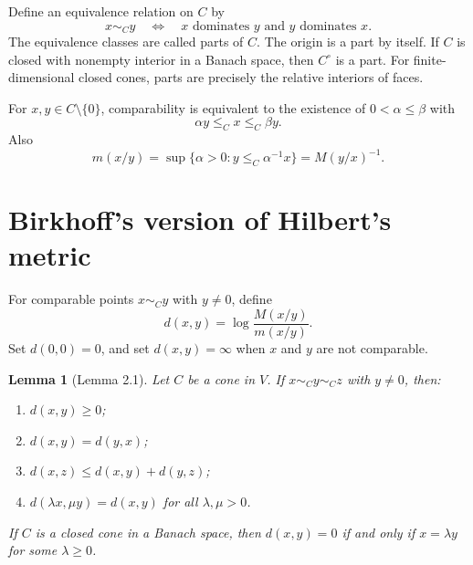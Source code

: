 \documentclass[11pt]{article}
\newtheorem{lemma}{Lemma}
\begin{document}
Define an equivalence relation on \(C\) by
\[
  x\sim_C y
  \quad\Longleftrightarrow\quad
  x\text{ dominates }y\text{ and }y\text{ dominates }x.
\]
The equivalence classes are called parts of \(C\).  The origin is a part by itself.  If \(C\) is closed with nonempty interior in a Banach space, then \(C^\circ\) is a part.  For finite-dimensional closed cones, parts are precisely the relative interiors of faces.

For \(x,y\in C\setminus\{0\}\), comparability is equivalent to the existence of \(0<\alpha\le\beta\) with
\[
  \alpha y\le_C x\le_C \beta y.
\]
Also
\begin{equation}
  m(x/y)=\sup\{\alpha>0:y\le_C \alpha^{-1}x\}=M(y/x)^{-1}.
  \label{eq:LN-m-inverse-M}
\end{equation}

\section{Birkhoff's version of Hilbert's metric}
For comparable points \(x\sim_C y\) with \(y\ne0\), define
\begin{equation}
  d(x,y)=\log\frac{M(x/y)}{m(x/y)}.
  \label{eq:LN-hilbert-metric}
\end{equation}
Set \(d(0,0)=0\), and set \(d(x,y)=\infty\) when \(x\) and \(y\) are not comparable.

\begin{lemma}[Lemma 2.1]
Let \(C\) be a cone in \(V\).  If \(x\sim_C y\sim_C z\) with \(y\ne0\), then:
\begin{enumerate}[label=(\roman*),leftmargin=2em]
\item \(d(x,y)\ge0\);
\item \(d(x,y)=d(y,x)\);
\item \(d(x,z)\le d(x,y)+d(y,z)\);
\item \(d(\lambda x,\mu y)=d(x,y)\) for all \(\lambda,\mu>0\).
\end{enumerate}
If \(C\) is a closed cone in a Banach space, then \(d(x,y)=0\) if and only if \(x=\lambda y\) for some \(\lambda\ge0\).
\end{lemma}
\end{document}
